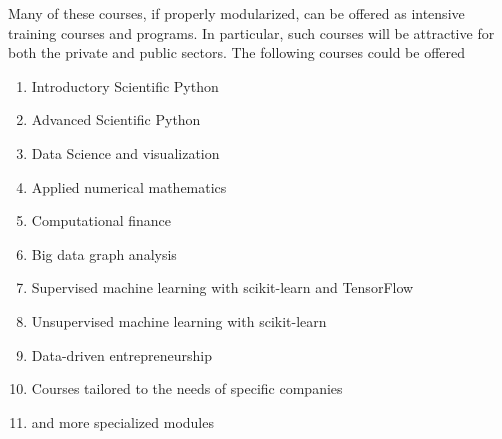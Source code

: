 \documentclass[oneside,final,10pt]{article}
\begin{document}
\noindent
Many of these courses, if properly modularized, can be offered as intensive training courses and programs. In particular, such courses will be attractive for both the private and public sectors. The following courses could be offered
\begin{enumerate}
\item Introductory Scientific Python

\item Advanced Scientific Python

\item Data Science and visualization

\item Applied numerical mathematics

\item Computational finance

\item Big data graph analysis

\item Supervised machine learning with scikit-learn and TensorFlow

\item Unsupervised machine learning with scikit-learn

\item Data-driven entrepreneurship

\item Courses tailored to the needs of specific companies

\item and more specialized modules
\end{enumerate}
\end{document}
